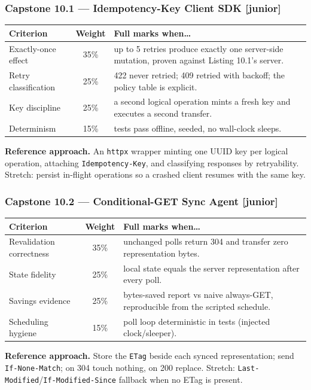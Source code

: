 \subsubsection*{Capstone 10.1 --- Idempotency-Key Client SDK [junior]}
\begin{center}\small
\begin{tabularx}{\textwidth}{l c X}
\toprule
\textbf{Criterion} & \textbf{Weight} & \textbf{Full marks when\ldots} \\
\midrule
Exactly-once effect & 35\% & up to 5 retries produce exactly one server-side mutation, proven against Listing 10.1's server. \\
Retry classification & 25\% & 422 never retried; 409 retried with backoff; the policy table is explicit. \\
Key discipline & 25\% & a second logical operation mints a fresh key and executes a second transfer. \\
Determinism & 15\% & tests pass offline, seeded, no wall-clock sleeps. \\
\bottomrule
\end{tabularx}
\end{center}
\textbf{Reference approach.} An \texttt{httpx} wrapper minting one UUID key
per logical operation, attaching \texttt{Idempotency-Key}, and classifying
responses by retryability. Stretch: persist in-flight operations so a
crashed client resumes with the same key.

\subsubsection*{Capstone 10.2 --- Conditional-GET Sync Agent [junior]}
\begin{center}\small
\begin{tabularx}{\textwidth}{l c X}
\toprule
\textbf{Criterion} & \textbf{Weight} & \textbf{Full marks when\ldots} \\
\midrule
Revalidation correctness & 35\% & unchanged polls return 304 and transfer zero representation bytes. \\
State fidelity & 25\% & local state equals the server representation after every poll. \\
Savings evidence & 25\% & bytes-saved report vs naive always-GET, reproducible from the scripted schedule. \\
Scheduling hygiene & 15\% & poll loop deterministic in tests (injected clock/sleeper). \\
\bottomrule
\end{tabularx}
\end{center}
\textbf{Reference approach.} Store the \texttt{ETag} beside each synced
representation; send \texttt{If-None-Match}; on 304 touch nothing, on 200
replace. Stretch: \texttt{Last-Modified}/\texttt{If-Modified-Since}
fallback when no ETag is present.


